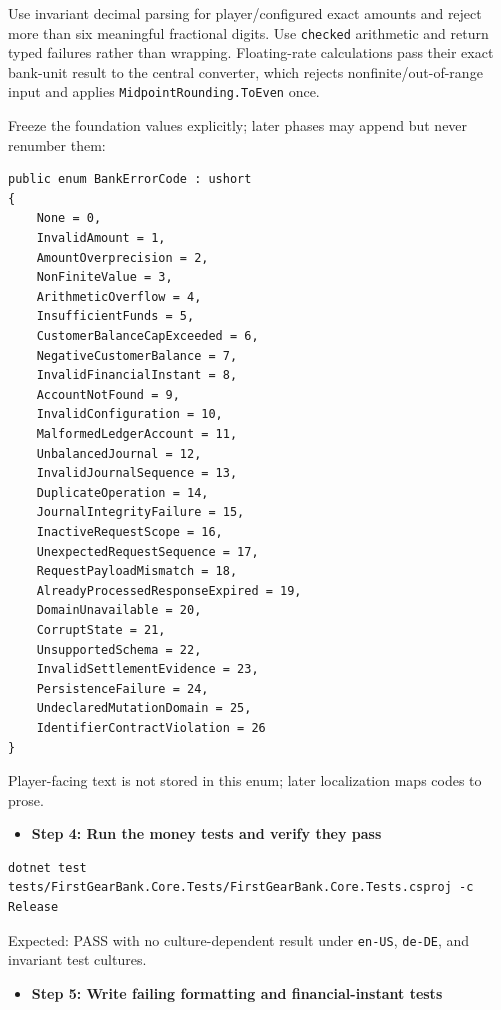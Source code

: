 \documentclass[
  10pt,
  letterpaper,
]{article}
\newcommand{\passthrough}[1]{#1}
\providecommand{\tightlist}{%
  \setlength{\itemsep}{0pt}\setlength{\parskip}{0pt}}
\begin{document}
Use invariant decimal parsing for player/configured exact amounts and
reject more than six meaningful fractional digits. Use
\passthrough{\lstinline!checked!} arithmetic and return typed failures
rather than wrapping. Floating-rate calculations pass their exact
bank-unit result to the central converter, which rejects
nonfinite/out-of-range input and applies
\passthrough{\lstinline!MidpointRounding.ToEven!} once.

Freeze the foundation values explicitly; later phases may append but
never renumber them:

\begin{lstlisting}
public enum BankErrorCode : ushort
{
    None = 0,
    InvalidAmount = 1,
    AmountOverprecision = 2,
    NonFiniteValue = 3,
    ArithmeticOverflow = 4,
    InsufficientFunds = 5,
    CustomerBalanceCapExceeded = 6,
    NegativeCustomerBalance = 7,
    InvalidFinancialInstant = 8,
    AccountNotFound = 9,
    InvalidConfiguration = 10,
    MalformedLedgerAccount = 11,
    UnbalancedJournal = 12,
    InvalidJournalSequence = 13,
    DuplicateOperation = 14,
    JournalIntegrityFailure = 15,
    InactiveRequestScope = 16,
    UnexpectedRequestSequence = 17,
    RequestPayloadMismatch = 18,
    AlreadyProcessedResponseExpired = 19,
    DomainUnavailable = 20,
    CorruptState = 21,
    UnsupportedSchema = 22,
    InvalidSettlementEvidence = 23,
    PersistenceFailure = 24,
    UndeclaredMutationDomain = 25,
    IdentifierContractViolation = 26
}
\end{lstlisting}

Player-facing text is not stored in this enum; later localization maps
codes to prose.

\begin{itemize}
\tightlist
\item[$\square$]
  \textbf{Step 4: Run the money tests and verify they pass}
\end{itemize}

\begin{lstlisting}
dotnet test tests/FirstGearBank.Core.Tests/FirstGearBank.Core.Tests.csproj -c Release
\end{lstlisting}

Expected: PASS with no culture-dependent result under
\passthrough{\lstinline!en-US!}, \passthrough{\lstinline!de-DE!}, and
invariant test cultures.

\begin{itemize}
\tightlist
\item[$\square$]
  \textbf{Step 5: Write failing formatting and financial-instant tests}
\end{itemize}
\end{document}
